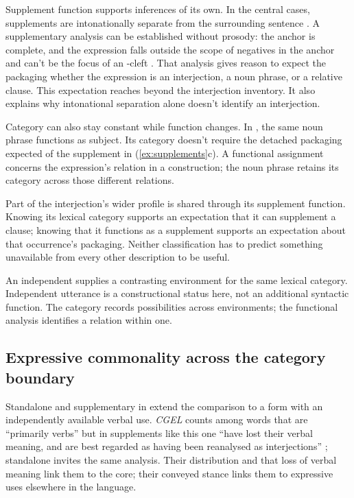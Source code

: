 \documentclass[12pt]{article}
\begin{document}
Supplement function supports inferences of its own. In the central cases,
supplements are intonationally separate from the surrounding sentence
\citep[1350]{HuddlestonPullum2002}. A supplementary analysis can be
established without prosody: the anchor is complete, and the expression
falls outside the scope of negatives in the anchor and can't be the focus
of an -cleft \citep[1360]{HuddlestonPullum2002}. That analysis
gives reason to expect the packaging whether the expression is an
interjection, a noun phrase, or a relative clause. This
expectation reaches beyond the interjection inventory. It also explains
why intonational separation alone doesn't identify an interjection.

Category can also stay constant while function changes. In
, the same noun phrase
functions as subject. Its category doesn't require the detached packaging
expected of the supplement in (\ref{ex:supplements}c). A functional
assignment concerns the expression's relation in a construction; the
noun phrase retains its category across those different relations.

Part of the interjection's wider profile is shared through its supplement
function. Knowing its lexical category supports an expectation that it can
supplement a clause; knowing that it functions as a supplement supports an
expectation about that occurrence's packaging. Neither classification has to
predict something unavailable from every other description to be useful.

An independent  supplies a contrasting environment for
the same lexical category. Independent utterance is a constructional
status here, not an additional syntactic function. The category records
possibilities across environments; the functional analysis identifies a
relation within one.

\subsection{Expressive commonality across the category boundary}\label{sec:damn-profiles}

Standalone  and supplementary  in
 extend the comparison to a form
with an independently available verbal use. \textit{CGEL} counts
 among words that are \enquote{primarily verbs} but in
supplements like this one \enquote{have lost their verbal meaning, and are
best regarded as having been reanalysed as interjections}
\citep[1361]{HuddlestonPullum2002}; standalone  invites the
same analysis. Their distribution and that loss of verbal meaning link them
to the core; their conveyed stance links them to
expressive uses elsewhere in the language.
\end{document}
